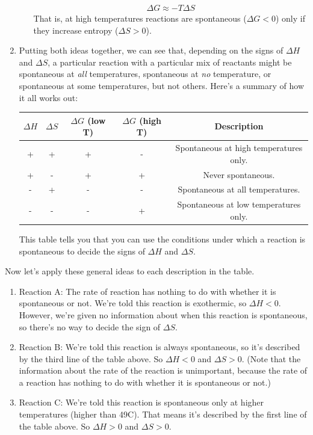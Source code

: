 \documentclass{article}  %
\begin{document}
\begin{enumerate}
\begin{enumerate}
\begin{equation*}
\begin{aligned}
                        \Delta G \approx -T \Delta S
                    \end{aligned}
                \end{equation*}
                That is, at high temperatures reactions are spontaneous ($\Delta G < 0$) only if they increase entropy ($\Delta S > 0$).
        \end{enumerate}
    \item Putting both ideas together, we can see that, depending on the signs of $\Delta H$ and $\Delta S$, a particular reaction with a particular mix of reactants might be spontaneous at \emph{all} temperatures, spontaneous at \emph{no} temperature, or spontaneous at some temperatures, but not others. Here's a summary of how it all works out:
        \begin{center}
            \begin{tabular}{| c | c | c | c | c |}
                $\Delta H$ & $\Delta S$ & $\Delta G$ (low T) & $\Delta G$ (high T) & Description \\
                \hline
                + & + & + & - & Spontaneous at high temperatures only. \\
                + & - & + & + & Never spontaneous. \\
                - & + & - & - & Spontaneous at all temperatures. \\
                - & - & - & + & Spontaneous at low temperatures only.
            \end{tabular}
        \end{center}
    This table tells you that you can use the conditions under which a reaction is spontaneous to decide the signs of $\Delta H$ and $\Delta S$. \\
\end{enumerate}
Now let's apply these general ideas to each description in the table.
\begin{enumerate}
    \item Reaction A: The rate of reaction has nothing to do with whether it is spontaneous or not. We're told this reaction is exothermic, so $\Delta H < 0$. However, we're given no information about when this reaction is spontaneous, so there's no way to decide the sign of $\Delta S$. 
    \item Reaction B: We're told this reaction is always spontaneous, so it's described by the third line of the table above. So $\Delta H < 0$ and $\Delta S > 0$. (Note that the information about the rate of the reaction is unimportant, because the rate of a reaction has nothing to do with whether it is spontaneous or not.) 
    \item Reaction C: We're told this reaction is spontaneous only at higher temperatures (higher than 49C). That means it's described by the first line of the table above. So $\Delta H > 0$ and $\Delta S > 0$. 
\end{enumerate}
\end{document}
